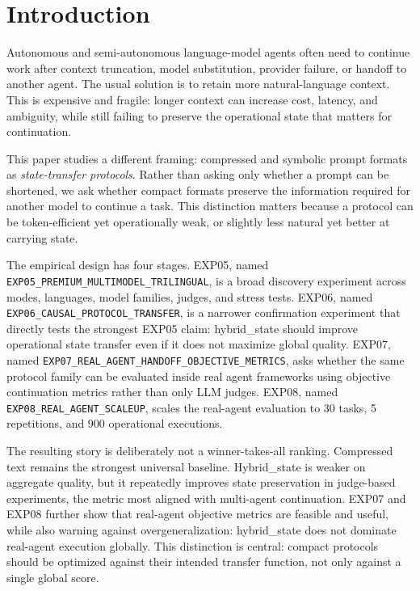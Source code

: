 \documentclass[11pt]{article}
\begin{document}
\section{Introduction}
Autonomous and semi-autonomous language-model agents often need to continue work after context truncation, model substitution, provider failure, or handoff to another agent. The usual solution is to retain more natural-language context. This is expensive and fragile: longer context can increase cost, latency, and ambiguity, while still failing to preserve the operational state that matters for continuation.

This paper studies a different framing: compressed and symbolic prompt formats as \emph{state-transfer protocols}. Rather than asking only whether a prompt can be shortened, we ask whether compact formats preserve the information required for another model to continue a task. This distinction matters because a protocol can be token-efficient yet operationally weak, or slightly less natural yet better at carrying state.

The empirical design has four stages. EXP05, named \texttt{EXP05\_PREMIUM\_MULTIMODEL\_TRILINGUAL}, is a broad discovery experiment across modes, languages, model families, judges, and stress tests. EXP06, named \texttt{EXP06\_CAUSAL\_PROTOCOL\_TRANSFER}, is a narrower confirmation experiment that directly tests the strongest EXP05 claim: hybrid\_state should improve operational state transfer even if it does not maximize global quality. EXP07, named \texttt{EXP07\_REAL\_AGENT\_HANDOFF\_OBJECTIVE\_METRICS}, asks whether the same protocol family can be evaluated inside real agent frameworks using objective continuation metrics rather than only LLM judges. EXP08, named \texttt{EXP08\_REAL\_AGENT\_SCALEUP}, scales the real-agent evaluation to 30 tasks, 5 repetitions, and 900 operational executions.

The resulting story is deliberately not a winner-takes-all ranking. Compressed text remains the strongest universal baseline. Hybrid\_state is weaker on aggregate quality, but it repeatedly improves state preservation in judge-based experiments, the metric most aligned with multi-agent continuation. EXP07 and EXP08 further show that real-agent objective metrics are feasible and useful, while also warning against overgeneralization: hybrid\_state does not dominate real-agent execution globally. This distinction is central: compact protocols should be optimized against their intended transfer function, not only against a single global score.
\end{document}
